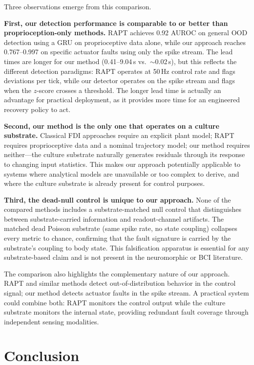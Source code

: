 Three observations emerge from this comparison.

\textbf{First, our detection performance is comparable to or better than
proprioception-only methods.} RAPT achieves 0.92 AUROC on general OOD
detection using a GRU on proprioceptive data alone, while our approach reaches
0.767--0.997 on specific actuator faults using only the spike stream. The
lead times are longer for our method (0.41--9.04\,s vs.\ $\sim$0.02\,s),
but this reflects the different detection paradigms: RAPT operates at 50\,Hz
control rate and flags deviations per tick, while our detector operates on
the spike stream and flags when the $z$-score crosses a threshold. The
longer lead time is actually an advantage for practical deployment, as it
provides more time for an engineered recovery policy to act.

\textbf{Second, our method is the only one that operates on a culture
substrate.} Classical FDI approaches \cite{isermann2005, deluca2003fdi}
require an explicit plant model; RAPT requires proprioceptive data and a
nominal trajectory model; our method requires neither---the culture
substrate naturally generates residuals through its response to changing
input statistics. This makes our approach potentially applicable to systems
where analytical models are unavailable or too complex to derive, and where
the culture substrate is already present for control purposes.

\textbf{Third, the dead-null control is unique to our approach.} None of the
compared methods includes a substrate-matched null control that distinguishes
between substrate-carried information and readout-channel artifacts. The
matched dead Poisson substrate (same spike rate, no state coupling) collapses
every metric to chance, confirming that the fault signature is carried by the
substrate's coupling to body state. This falsification apparatus is
essential for any substrate-based claim and is not present in the
neuromorphic or BCI literature.

The comparison also highlights the complementary nature of our approach.
RAPT and similar methods detect out-of-distribution behavior in the control
signal; our method detects actuator faults in the spike stream. A practical
system could combine both: RAPT monitors the control output while the culture
substrate monitors the internal state, providing redundant fault coverage
through independent sensing modalities.

\section{Conclusion}

